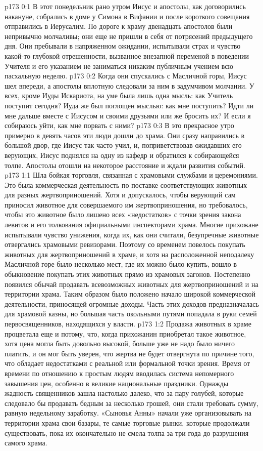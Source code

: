 \author{Комиссия срединников}
\vs p173 0:1 В этот понедельник рано утром Иисус и апостолы, как договорились накануне, собрались в доме у Симона в Вифании и после короткого совещания отправились в Иерусалим. По дороге к храму двенадцать апостолов были непривычно молчаливы; они еще не пришли в себя от потрясений предыдущего дня. Они пребывали в напряженном ожидании, испытывали страх и чувство какой\hyp{}то глубокой отрешенности, вызванное внезапной переменой в поведении Учителя и его указанием не заниматься никаким публичным учением всю пасхальную неделю.
\vs p173 0:2 Когда они спускались с Масличной горы, Иисус шел впереди, а апостолы вплотную следовали за ним в задумчивом молчании. У всех, кроме Иуды Искариота, на уме была лишь одна мысль: как Учитель поступит сегодня? Иуда же был поглощен мыслью: как мне поступить? Идти ли мне дальше вместе с Иисусом и своими друзьями или же бросить их? И если я собираюсь уйти, как мне порвать с ними?
\vs p173 0:3 В это прекрасное утро примерно в девять часов эти люди дошли до храма. Они сразу направились в большой двор, где Иисус так часто учил, и, поприветствовав ожидавших его верующих, Иисус поднялся на одну из кафедр и обратился к собирающейся толпе. Апостолы отошли на некоторое расстояние и ждали развития событий.
\vs p173 1:1 Шла бойкая торговля, связанная с храмовыми службами и церемониями. Это была коммерческая деятельность по поставке соответствующих животных для разных жертвоприношений. Хотя и допускалось, чтобы верующий сам приносил животное для совершаемого им жертвоприношения, но требовалось, чтобы это животное было лишено всех «недостатков» с точки зрения закона левитов и его толкования официальными инспекторами храма. Многие прихожане испытывали чувство унижения, когда их, как они считали, безупречные животные отвергались храмовыми ревизорами. Поэтому со временем повелось покупать животных для жертвоприношений в храме, и хотя на расположенной неподалеку Масличной горе было несколько мест, где их можно было купить, вошло в обыкновение покупать этих животных прямо из храмовых загонов. Постепенно появился обычай продавать всевозможных животных для жертвоприношений и на территории храма. Таким образом было положено начало широкой коммерческой деятельности, приносящей огромные доходы. Часть этих доходов предназначалась для храмовой казны, но большая часть окольными путями попадала в руки семей первосвященников, находящихся у власти.
\vs p173 1:2 Продажа животных в храме процветала еще и потому, что, когда прихожанин приобретал такое животное, хотя цена могла быть довольно высокой, больше уже не надо было ничего платить, и он мог быть уверен, что жертва не будет отвергнута по причине того, что обладает недостатками с реальной или формальной точки зрения. Время от времени по отношению к простым людям вводилась система непомерного завышения цен, особенно в великие национальные праздники. Однажды жадность священников зашла настолько далеко, что за пару голубей, которые следовало бы продавать бедным за несколько грошей, они стали требовать сумму, равную недельному заработку. «Сыновья Анны» начали уже организовывать на территории храма свои базары, те самые торговые рынки, которые продолжали существовать, пока их окончательно не смела толпа за три года до разрушения самого храма.
